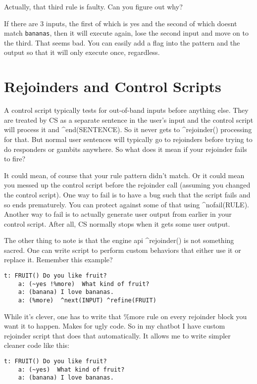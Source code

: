 \documentclass[]{article}
\begin{document}
Actually, that third rule is faulty. Can you figure out why?

If there are 3 inputs, the first of which is yes and the second of which
doesnt match \texttt{bananas}, then it will execute again, lose the
second input and move on to the third. That seems bad. You can easily
add a flag into the pattern and the output so that it will only execute
once, regardless.

\section{Rejoinders and Control
Scripts}\label{rejoinders-and-control-scripts}

A control script typically tests for out-of-band inputs before anything
else. They are treated by CS as a separate sentence in the user's input
and the control script will process it and \^{}end(SENTENCE). So it
never gets to \^{}rejoinder() processing for that. But normal user
sentences will typically go to rejoinders before trying to do responders
or gambits anywhere. So what does it mean if your rejoinder fails to
fire?

It could mean, of course that your rule pattern didn't match. Or it
could mean you messed up the control script before the rejoinder call
(assuming you changed the control script). One way to fail is to have a
bug such that the script fails and so ends prematurely. You can protect
against some of that using \^{}nofail(RULE). Another way to fail is to
actually generate user output from earlier in your control script. After
all, CS normally stops when it gets some user output.

The other thing to note is that the engine api \^{}rejoinder() is not
something sacred. One can write script to perform custom behaviors that
either use it or replace it. Remember this example?

\begin{verbatim}
t: FRUIT() Do you like fruit?
    a: (~yes !%more)  What kind of fruit?
    a: (banana) I love bananas.
    a: (%more)  ^next(INPUT) ^refine(FRUIT)
\end{verbatim}

While it's clever, one has to write that \%more rule on every rejoinder
block you want it to happen. Makes for ugly code. So in my chatbot I
have custom rejoinder script that does that automatically. It allows me
to write simpler cleaner code like this:

\begin{verbatim}
t: FRUIT() Do you like fruit?
    a: (~yes)  What kind of fruit?
    a: (banana) I love bananas.
\end{verbatim}
\end{document}

